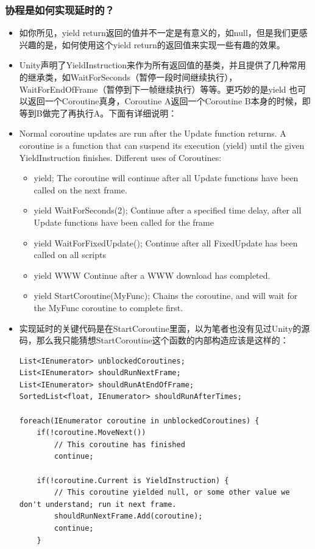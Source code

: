 \documentclass[9pt, b5paper]{article}
\begin{document}
\subsubsection{协程是如何实现延时的？}
\label{sec:org63044a1}
\begin{itemize}
\item 如你所见，yield return返回的值并不一定是有意义的，如null，但是我们更感兴趣的是，如何使用这个yield return的返回值来实现一些有趣的效果。
\item Unity声明了YieldInstruction来作为所有返回值的基类，并且提供了几种常用的继承类，如WaitForSeconds（暂停一段时间继续执行），WaitForEndOfFrame（暂停到下一帧继续执行）等等。更巧妙的是yield 也可以返回一个Coroutine真身，Coroutine A返回一个Coroutine B本身的时候，即等到B做完了再执行A。下面有详细说明：
\item Normal coroutine updates are run after the Update function returns. A coroutine is a function that can suspend its execution (yield) until the given YieldInstruction finishes. Different uses of Coroutines:
\begin{itemize}
\item yield; The coroutine will continue after all Update functions have been called on the next frame.
\item yield WaitForSeconds(2); Continue after a specified time delay, after all Update functions have been called for the frame
\item yield WaitForFixedUpdate(); Continue after all FixedUpdate has been called on all scripts
\item yield WWW Continue after a WWW download has completed.
\item yield StartCoroutine(MyFunc); Chains the coroutine, and will wait for the MyFunc coroutine to complete first.
\end{itemize}
\item 实现延时的关键代码是在StartCoroutine里面，以为笔者也没有见过Unity的源码，那么我只能猜想StartCoroutine这个函数的内部构造应该是这样的：
\begin{verbatim}
List<IEnumerator> unblockedCoroutines;
List<IEnumerator> shouldRunNextFrame;
List<IEnumerator> shouldRunAtEndOfFrame;
SortedList<float, IEnumerator> shouldRunAfterTimes;

foreach(IEnumerator coroutine in unblockedCoroutines) {
    if(!coroutine.MoveNext())
        // This coroutine has finished
        continue;
 
    if(!coroutine.Current is YieldInstruction) {    
        // This coroutine yielded null, or some other value we don't understand; run it next frame.
        shouldRunNextFrame.Add(coroutine);
        continue;
    }
 

\end{verbatim}
\end{itemize}
\end{document}
